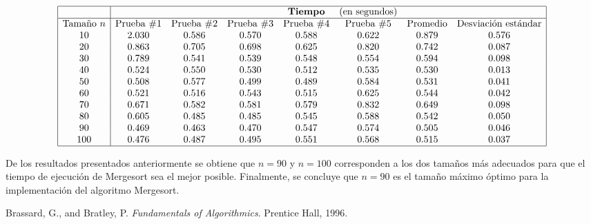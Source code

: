 \documentclass{article}
\begin{document}
	$$\begin{array}{|c|ccccccc|}
		\hline
		& & &&\text{\textbf{Tiempo}} &\text{(en segundos)} & &\\
		\hline
		\text{Tamaño}\ n & \text{Prueba}\ \# 1 & \text{Prueba}\ \# 2 & \text{Prueba}\ \# 3 & \text{Prueba}\ \# 4 & \text{Prueba}\ \# 5 & \text{Promedio} & \text{Desviación estándar}\\
		10 & 2.030 & 0.586 & 0.570 & 0.588 & 0.622 & 0.879 & 0.576\\
		20 & 0.863 & 0.705 & 0.698 & 0.625 & 0.820 & 0.742 & 0.087\\
		30 & 0.789 & 0.541 & 0.539 & 0.548 & 0.554 & 0.594 & 0.098\\
		40 & 0.524 & 0.550 & 0.530 & 0.512 & 0.535 & 0.530 & 0.013\\
		50 & 0.508 & 0.577 & 0.499 & 0.489 & 0.584 & 0.531 & 0.041\\
		60 & 0.521 & 0.516 & 0.543 & 0.515 & 0.625 & 0.544 & 0.042\\
		70 & 0.671 & 0.582 & 0.581 & 0.579 & 0.832 & 0.649 & 0.098\\
		80 & 0.605 & 0.485 & 0.485 & 0.545 & 0.588 & 0.542 & 0.050\\
		90 & 0.469 & 0.463 & 0.470 & 0.547 & 0.574 & 0.505 & 0.046\\
		100 & 0.476 & 0.487 & 0.495 & 0.551 & 0.568 & 0.515 & 0.037\\
		\hline
	\end{array}$$\:
	
	De los resultados presentados anteriormente se obtiene que $n = 90$ y $n = 100$ corresponden a los dos tamaños m\'as adecuados para que el tiempo de ejecuci\'on de Mergesort sea el mejor posible. Finalmente, se concluye que $n = 90$ es el tamaño m\'aximo \'optimo para la implementaci\'on del algoritmo Mergesort.
	
	\begin{thebibliography}{}
		 Brassard, G., and Bratley, P. \textit{Fundamentals of Algorithmics}. Prentice Hall, 1996.
	\end{thebibliography}
	
\end{document}
